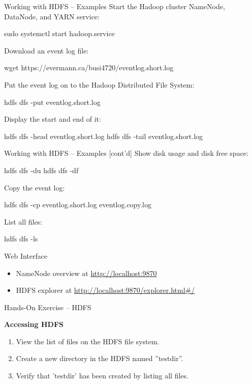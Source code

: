\documentclass[ignorenonframetext,xcolor=x11names]{beamer}
\begin{document}
\begin{frame}[fragile]{Working with HDFS -- Examples}
Start the Hadoop cluster NameNode, DataNode, and YARN service:
\begin{bashcode}
sudo systemctl start hadoop.service
\end{bashcode}
Download an event log file:
\begin{bashcode}
wget https://evermann.ca/busi4720/eventlog.short.log
\end{bashcode}
Put the event log on to the Hadoop Distributed File System:
\begin{bashcode}
hdfs dfs -put eventlog.short.log
\end{bashcode}
Display the start and end of it:
\begin{bashcode}
hdfs dfs -head eventlog.short.log
hdfs dfs -tail eventlog.short.log
\end{bashcode}
\end{frame}

\begin{frame}[fragile]{Working with HDFS -- Examples \small [cont'd]}
Show disk usage and disk free space:
\begin{bashcode}
hdfs dfs -du
hdfs dfs -df
\end{bashcode}
Copy the event log:
\begin{bashcode}
hdfs dfs -cp eventlog.short.log eventlog.copy.log
\end{bashcode}
List all files:
\begin{bashcode}
hdfs dfs -ls
\end{bashcode}
\begin{block}{Web Interface}
\begin{itemize}
\item NameNode overview at \url{http://localhost:9870}
\item HDFS explorer at \url{http://localhost:9870/explorer.html#/}
\end{itemize}
\end{block}
\end{frame}

\begin{frame}{Hands-On Exercise -- HDFS} 

\textbf{Accessing HDFS}

\begin{enumerate}
  \item View the list of files on the HDFS file system.
  \item Create a new directory in the HDFS named ''testdir''.
  \item Verify that 'testdir' has been created by listing all files.
\end{enumerate}
\end{frame}
\end{document}
